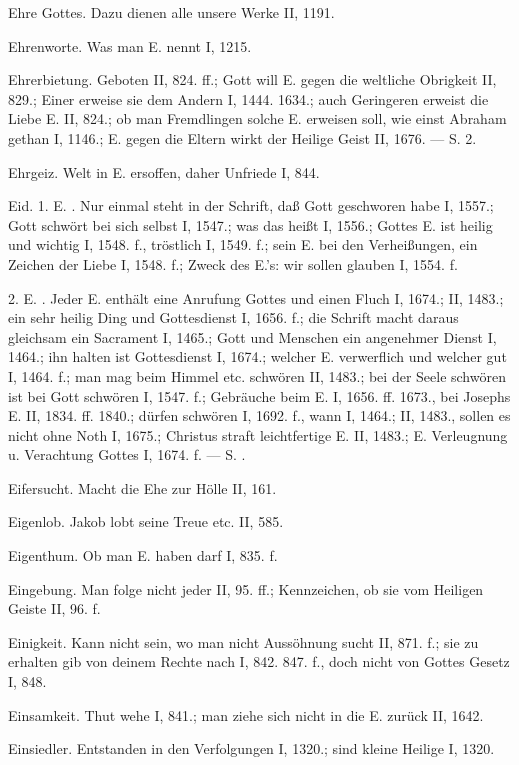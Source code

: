Ehre Gottes. Dazu dienen alle unsere Werke II, 1191.

Ehrenworte. Was man E. nennt I, 1215.

Ehrerbietung. Geboten II, 824. ff.; Gott will E. gegen die weltliche Obrigkeit II, 829.; Einer erweise sie dem Andern I, 1444. 1634.; auch Geringeren erweist die Liebe E. II, 824.; ob man Fremdlingen solche E. erweisen soll, wie einst Abraham gethan I, 1146.; E. gegen die Eltern wirkt der Heilige Geist II, 1676. — S.  2.

Ehrgeiz. Welt in E. ersoffen, daher Unfriede I, 844.

Eid. 1. E. . Nur einmal steht in der Schrift, daß Gott geschworen habe I, 1557.; Gott schwört bei sich selbst I, 1547.; was das heißt I, 1556.; Gottes E. ist heilig und wichtig I, 1548. f., tröstlich I, 1549. f.; sein E. bei den Verheißungen, ein Zeichen der Liebe I, 1548. f.; Zweck des E.’s: wir sollen glauben I, 1554. f.

2. E. . Jeder E. enthält eine Anrufung Gottes und einen Fluch I, 1674.; II, 1483.; ein sehr heilig Ding und Gottesdienst I, 1656. f.; die Schrift macht daraus gleichsam ein Sacrament I, 1465.; Gott und Menschen ein angenehmer Dienst I, 1464.; ihn halten ist Gottesdienst I, 1674.; welcher E. verwerflich und welcher gut I, 1464. f.; man mag beim Himmel etc. schwören II, 1483.; bei der Seele schwören ist bei Gott schwören I, 1547. f.; Gebräuche beim E. I, 1656. ff. 1673., bei Josephs E. II, 1834. ff. 1840.;  dürfen schwören I, 1692. f., wann I, 1464.; II, 1483., sollen es nicht ohne Noth I, 1675.; Christus straft leichtfertige E. II, 1483.;  E. Verleugnung u. Verachtung Gottes I, 1674. f. — S. .

Eifersucht. Macht die Ehe zur Hölle II, 161.

Eigenlob. Jakob lobt seine Treue etc. II, 585.

Eigenthum. Ob man E. haben darf I, 835. f.

Eingebung. Man folge nicht jeder II, 95. ff.; Kennzeichen, ob sie vom Heiligen Geiste II, 96. f.

Einigkeit. Kann nicht sein, wo man nicht Aussöhnung sucht II, 871. f.; sie zu erhalten gib von deinem Rechte nach I, 842. 847. f., doch nicht von Gottes Gesetz I, 848.

Einsamkeit. Thut wehe I, 841.; man ziehe sich nicht in die E. zurück II, 1642.

Einsiedler. Entstanden in den Verfolgungen I, 1320.; sind kleine Heilige I, 1320.

